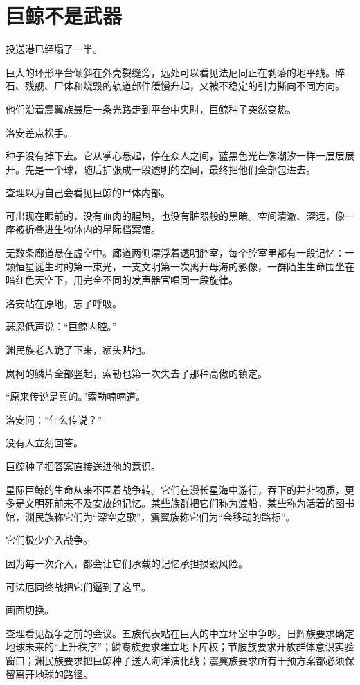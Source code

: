 \chapter{巨鲸不是武器}

投送港已经塌了一半。

巨大的环形平台倾斜在外壳裂缝旁，远处可以看见法厄同正在剥落的地平线。碎石、残舰、尸体和烧毁的轨道部件缓慢升起，又被不稳定的引力撕向不同方向。

他们沿着震翼族最后一条光路走到平台中央时，巨鲸种子突然变热。

洛安差点松手。

种子没有掉下去。它从掌心悬起，停在众人之间，蓝黑色光芒像潮汐一样一层层展开。先是一个球，随后扩张成一段透明的空间，最终把他们全部包进去。

查理以为自己会看见巨鲸的尸体内部。

可出现在眼前的，没有血肉的腥热，也没有脏器般的黑暗。空间清澈、深远，像一座被折叠进生物体内的星际档案馆。

无数条廊道悬在虚空中。廊道两侧漂浮着透明腔室，每个腔室里都有一段记忆：一颗恒星诞生时的第一束光，一支文明第一次离开母海的影像，一群陌生生命围坐在暗红色天空下，用完全不同的发声器官唱同一段旋律。

洛安站在原地，忘了呼吸。

瑟恩低声说：“巨鲸内腔。”

渊民族老人跪了下来，额头贴地。

岚柯的鳞片全部竖起，索勒也第一次失去了那种高傲的镇定。

“原来传说是真的。”索勒喃喃道。

洛安问：“什么传说？”

没有人立刻回答。

巨鲸种子把答案直接送进他的意识。

星际巨鲸的生命从来不围着战争转。它们在漫长星海中游行，吞下的并非物质，更多是文明死前来不及安放的记忆。某些族群把它们称为渡船，某些称为活着的图书馆，渊民族称它们为“深空之歌”，震翼族称它们为“会移动的路标”。

它们极少介入战争。

因为每一次介入，都会让它们承载的记忆承担损毁风险。

可法厄同终战把它们逼到了这里。

画面切换。

查理看见战争之前的会议。五族代表站在巨大的中立环室中争吵。日辉族要求确定地球未来的“上升秩序”；鳞裔族要求建立地下库权；节肢族要求开放群体意识实验窗口；渊民族要求把巨鲸种子送入海洋演化线；震翼族要求所有干预方案都必须保留离开地球的路径。

